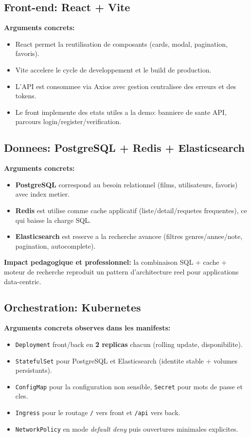 \documentclass[11pt,a4paper]{article}
\begin{document}
\subsection{Front-end: React + Vite}

\textbf{Arguments concrets:}
\begin{itemize}
  \item React permet la reutilisation de composants (cards, modal, pagination, favoris).
  \item Vite accelere le cycle de developpement et le build de production.
  \item L'API est consommee via Axios avec gestion centralisee des erreurs et des tokens.
  \item Le front implemente des etats utiles a la demo: banniere de sante API, parcours login/register/verification.
\end{itemize}

\subsection{Donnees: PostgreSQL + Redis + Elasticsearch}

\textbf{Arguments concrets:}
\begin{itemize}
  \item \textbf{PostgreSQL} correspond au besoin relationnel (films, utilisateurs, favoris) avec index metier.
  \item \textbf{Redis} est utilise comme cache applicatif (liste/detail/requetes frequentes), ce qui baisse la charge SQL.
  \item \textbf{Elasticsearch} est reserve a la recherche avancee (filtres genres/annee/note, pagination, autocomplete).
\end{itemize}

\textbf{Impact pedagogique et professionnel:} la combinaison SQL + cache + moteur de recherche reproduit un pattern d'architecture
reel pour applications data-centric.

\subsection{Orchestration: Kubernetes}

\textbf{Arguments concrets observes dans les manifests:}
\begin{itemize}
  \item \texttt{Deployment} front/back en \textbf{2 replicas} chacun (rolling update, disponibilite).
  \item \texttt{StatefulSet} pour PostgreSQL et Elasticsearch (identite stable + volumes persistants).
  \item \texttt{ConfigMap} pour la configuration non sensible, \texttt{Secret} pour mots de passe et cles.
  \item \texttt{Ingress} pour le routage \texttt{/} vers front et \texttt{/api} vers back.
  \item \texttt{NetworkPolicy} en mode \textit{default deny} puis ouvertures minimales explicites.
\end{itemize}
\end{document}
